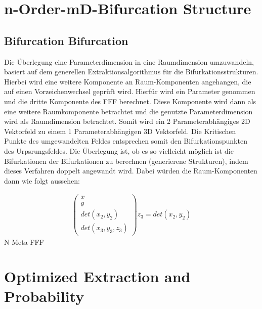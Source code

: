 \documentclass[11pt]{article}
\begin{document}
\section{n-Order-mD-Bifurcation Structure}
\subsection{Bifurcation Bifurcation}
Die Überlegung eine Parameterdimension in eine Raumdimension umzuwandeln, basiert auf dem generellen Extraktionsalgorithmus für die Bifurkationsstrukturen.
Hierbei wird eine weitere Komponente an Raum-Komponenten angehangen, die auf einen Vorzeichenwechsel geprüft wird.
Hierfür wird ein Parameter genommen und die dritte Komponente des FFF berechnet. Diese Komponente wird dann als eine weitere Raumkomponente betrachtet und die genutzte Parameterdimension wird als Raumdimension betrachtet. Somit wird ein 2 Parameterabhängiges 2D Vektorfeld zu einem 1 Parameterabhängigen 3D Vektorfeld.
Die Kritischen Punkte des umgewandelten Feldes entsprechen somit den Bifurkationspunkten des Urpsrungsfeldes.
Die Überlegung ist, ob es so vielleicht möglich ist die Bifurkationen der Bifurkationen zu berechnen (generierene Strukturen), indem dieses Verfahren doppelt angewandt wird.
Dabei würden die Raum-Komponenten dann wie folgt aussehen:

\begin{align}
\begin{pmatrix}x\\y\\det(x_2,y_2)\\det(x_3,y_3,z_3)\end{pmatrix}
z_3 = det(x_2,y_2)
\end{align}
N-Meta-FFF
\section{Optimized Extraction and Probability}
\end{document}
